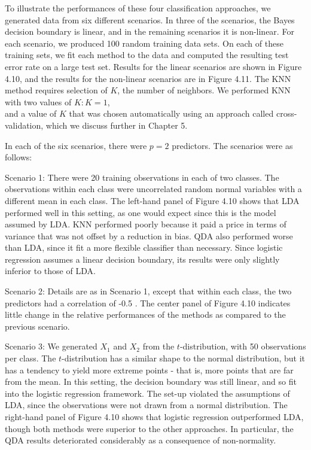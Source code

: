 \documentclass[10pt]{article}
\begin{document}
To illustrate the performances of these four classification approaches, we generated data from six different scenarios. In three of the scenarios, the Bayes decision boundary is linear, and in the remaining scenarios it is non-linear. For each scenario, we produced 100 random training data sets. On each of these training sets, we fit each method to the data and computed the resulting test error rate on a large test set. Results for the linear scenarios are shown in Figure 4.10, and the results for the non-linear scenarios are in Figure 4.11. The KNN method requires selection of $K$, the number of neighbors. We performed KNN with two values of $K: K=1$,\\
and a value of $K$ that was chosen automatically using an approach called cross-validation, which we discuss further in Chapter 5.

In each of the six scenarios, there were $p=2$ predictors. The scenarios were as follows:

Scenario 1: There were 20 training observations in each of two classes. The observations within each class were uncorrelated random normal variables with a different mean in each class. The left-hand panel of Figure 4.10 shows that LDA performed well in this setting, as one would expect since this is the model assumed by LDA. KNN performed poorly because it paid a price in terms of variance that was not offset by a reduction in bias. QDA also performed worse than LDA, since it fit a more flexible classifier than necessary. Since logistic regression assumes a linear decision boundary, its results were only slightly inferior to those of LDA.

Scenario 2: Details are as in Scenario 1, except that within each class, the two predictors had a correlation of -0.5 . The center panel of Figure 4.10 indicates little change in the relative performances of the methods as compared to the previous scenario.

Scenario 3: We generated $X_{1}$ and $X_{2}$ from the $t$-distribution, with 50 observations per class. The $t$-distribution has a similar shape to the normal distribution, but it has a tendency to yield more extreme points - that is, more points that are far from the mean. In this setting, the decision boundary was still linear, and so fit into the logistic regression framework. The set-up violated the assumptions of LDA, since the observations were not drawn from a normal distribution. The right-hand panel of Figure 4.10 shows that logistic regression outperformed LDA, though both methods were superior to the other approaches. In particular, the QDA results deteriorated considerably as a consequence of non-normality.
\end{document}

